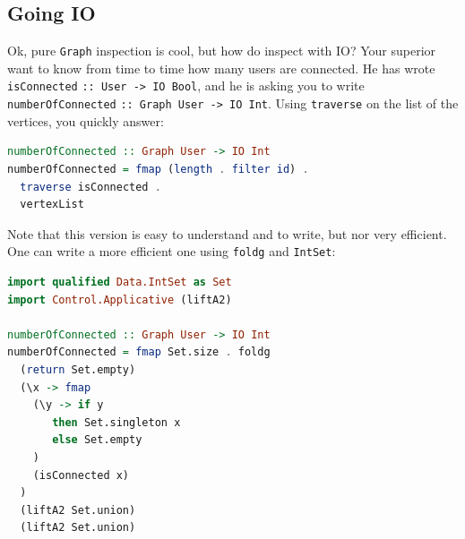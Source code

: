 \documentclass[10pt,a4paper]{article}
\begin{document}
\subsection{Going IO}
Ok, pure \verb|Graph| inspection is cool, but how do inspect with IO? Your superior want to know from time to time how many users are connected. He has wrote \verb|isConnected| \verb|:: User -> IO Bool|, and he is asking you to write \verb|numberOfConnected| \verb|:: Graph User -> IO Int|. Using \verb|traverse| on the list of the vertices, you quickly answer:
\begin{lstlisting}[language=Haskell, frame=single]
numberOfConnected :: Graph User -> IO Int
numberOfConnected = fmap (length . filter id) .
  traverse isConnected .
  vertexList
\end{lstlisting}

Note that this version is easy to understand and to write, but nor very efficient. One can write a more efficient one using \verb|foldg| and \verb|IntSet|:
\begin{lstlisting}[language=Haskell, frame=single]
import qualified Data.IntSet as Set
import Control.Applicative (liftA2)

numberOfConnected :: Graph User -> IO Int
numberOfConnected = fmap Set.size . foldg
  (return Set.empty)
  (\x -> fmap
    (\y -> if y
       then Set.singleton x
       else Set.empty
    )
    (isConnected x)
  )
  (liftA2 Set.union)
  (liftA2 Set.union)
\end{lstlisting}
\end{document}
